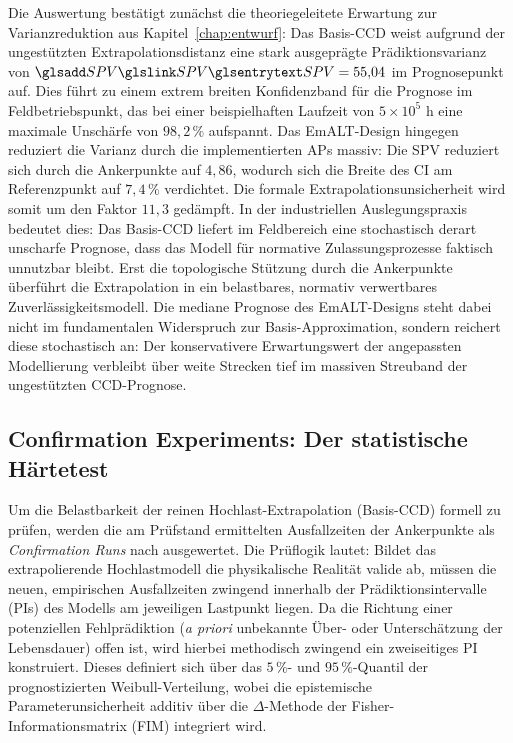 Die Auswertung bestätigt zunächst die theoriegeleitete Erwartung zur Varianzreduktion aus Kapitel~\ref{chap:entwurf}:
Das Basis-\ac{CCD} weist aufgrund der ungestützten Extrapolationsdistanz eine stark ausgeprägte Prädiktionsvarianz von $\sym{SPV} = 55{,}04$ im Prognosepunkt auf.
Dies führt zu einem extrem breiten Konfidenzband für die Prognose im Feldbetriebspunkt, das bei einer beispielhaften Laufzeit von $5\times 10^5\text{ h}$ eine maximale Unschärfe von $98{,}2\,\%$ aufspannt.
Das \ac{EmALT}-Design hingegen reduziert die Varianz durch die implementierten \acp{AP} massiv:
Die \ac{SPV} reduziert sich durch die Ankerpunkte auf $4{,}86$, wodurch sich die Breite des \ac{CI} am Referenzpunkt auf $7{,}4\,\%$ verdichtet.
Die formale Extrapolationsunsicherheit wird somit um den Faktor $11{,}3$ gedämpft.
In der industriellen Auslegungspraxis bedeutet dies: Das Basis-\ac{CCD} liefert im Feldbereich eine stochastisch derart unscharfe Prognose, dass das Modell für normative Zulassungsprozesse faktisch unnutzbar bleibt.
Erst die topologische Stützung durch die Ankerpunkte überführt die Extrapolation in ein belastbares, normativ verwertbares Zuverlässigkeitsmodell.
Die mediane Prognose des \ac{EmALT}-Designs steht dabei nicht im fundamentalen Widerspruch zur Basis-Approximation, sondern reichert diese stochastisch an: Der konservativere Erwartungswert der angepassten Modellierung verbleibt über weite Strecken tief im massiven Streuband der ungestützten \ac{CCD}-Prognose.

\subsection{Confirmation Experiments: Der statistische Härtetest}\label{subsec:confirmationruns}

Um die Belastbarkeit der reinen Hochlast-Extrapolation (Basis-\ac{CCD}) formell zu prüfen, werden die am Prüfstand ermittelten Ausfallzeiten der Ankerpunkte als \textit{Confirmation Runs} nach \textcite{Stevens.2019} ausgewertet.
Die Prüflogik lautet: Bildet das extrapolierende Hochlastmodell die physikalische Realität valide ab, müssen die neuen, empirischen Ausfallzeiten zwingend innerhalb der Prädiktionsintervalle (\acp{PI}) des Modells am jeweiligen Lastpunkt liegen.
Da die Richtung einer potenziellen Fehlprädiktion (\textit{a priori} unbekannte Über- oder Unterschätzung der Lebensdauer) offen ist, wird hierbei methodisch zwingend ein zweiseitiges \ac{PI} konstruiert.
Dieses definiert sich über das $5\,\%$- und $95\,\%$-Quantil der prognostizierten Weibull-Verteilung, wobei die epistemische Parameterunsicherheit additiv über die $\Delta$-Methode der Fisher-Informationsmatrix (\ac{FIM}) integriert wird.


